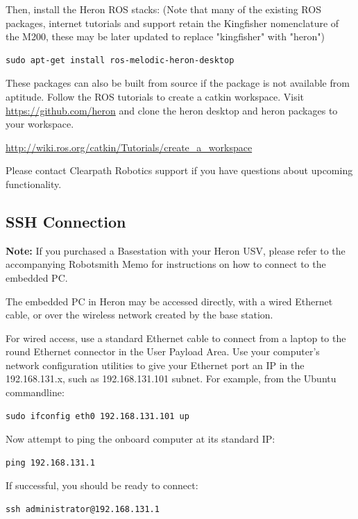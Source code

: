 \documentclass[]{clearpath-latex/clearpath-manual}
\begin{document}
Then, install the Heron ROS stacks:
(Note that many of the existing ROS packages, internet tutorials and support retain the Kingfisher nomenclature of the M200, these may be later updated to replace "kingfisher" with "heron")

\begin{lstlisting}
sudo apt-get install ros-melodic-heron-desktop
\end{lstlisting}

These packages can also be built from source if the package is not available from aptitude. Follow the ROS tutorials to create a catkin workspace. Visit \url{https://github.com/heron} and clone the heron desktop and heron packages to your workspace.

\url{http://wiki.ros.org/catkin/Tutorials/create_a_workspace}

Please contact Clearpath Robotics support if you have questions about upcoming functionality.



\subsection{SSH Connection}

\textbf{Note:} If you purchased a Basestation with your Heron USV, please refer to the accompanying Robotsmith Memo for instructions on how to connect to the embedded PC.

The embedded PC in Heron may be accessed directly, with a wired Ethernet cable, or over the wireless network created by the base station.

For wired access, use a standard Ethernet cable to connect from a laptop to the round Ethernet connector in the User Payload Area. Use your computer’s network configuration utilities to give your Ethernet port an IP in the 192.168.131.x, such as 192.168.131.101 subnet. For example, from the Ubuntu commandline:

\begin{lstlisting}
sudo ifconfig eth0 192.168.131.101 up
\end{lstlisting}

Now attempt to ping the onboard computer at its standard IP:

\begin{lstlisting}
ping 192.168.131.1
\end{lstlisting}

If successful, you should be ready to connect:

\begin{lstlisting}
ssh administrator@192.168.131.1
\end{lstlisting}
\end{document}
